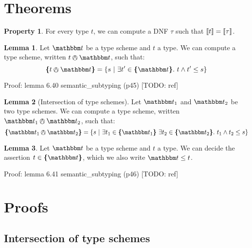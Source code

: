 \documentclass[a4paper]{article}
\theoremstyle{definition}
\newtheorem{lemma}{Lemma}
\newtheorem{property}{Property}
\begin{document}
    \section{Theorems}

    \begin{property}
      For every type $t$, we can compute a DNF $\tau$ such that ${\llbracket t \rrbracket} = {\llbracket \tau \rrbracket}$.
    \end{property}

    \begin{lemma}
      Let $\ts$ be a type scheme and $t$ a type. We can compute a type scheme, written $t \tsand \ts$, such that:
      \[\tsint {t \tsand \ts} = \{s \alt \exists t' \in \tsint \ts.\ t \land t' \leq s \}\]
    \end{lemma}
    Proof: lemma 6.40 semantic\_subtyping (p45) [TODO: ref]

    \begin{lemma}[Intersection of type schemes]
      Let $\ts_1$ and $\ts_2$ be two type schemes. We can compute a type scheme, written $\ts_1 \tsand \ts_2$, such that:
      \[\tsint {\ts_1 \tsand \ts_2} = \{s\alt \exists t_1 \in \tsint {\ts_1}\ 
      \exists t_2 \in \tsint {\ts_2}.\ {t_1} \land {t_2} \leq s\}\]
    \end{lemma}

    \begin{lemma}
      Let $\ts$ be a type scheme and $t$ a type. We can decide the assertion $t \in \tsint \ts$,
      which we also write $\ts \leq t$.
    \end{lemma}
    Proof: lemma 6.41 semantic\_subtyping (p46) [TODO: ref]

    \section{Proofs}

    \subsection{Intersection of type schemes}
\end{document}
